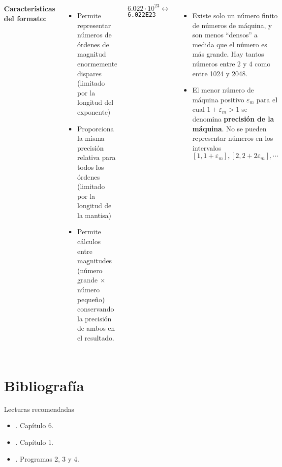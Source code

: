 \documentclass[9pt, aspectratio=169]{beamer}
\begin{document}
\begin{frame}
\begin{columns}[t]
\cx
\textbf{Características del formato:}
\begin{itemize}
    \item Permite representar números de órdenes de magnitud enormemente dispares (limitado por la longitud del exponente)
    \item Proporciona la misma precisión relativa para todos los órdenes (limitado por la longitud de la mantisa)
    \item Permite cálculos entre magnitudes (número grande $\times$ número pequeño) conservando la precisión de ambos en el resultado.
\end{itemize}

\begin{center}
    $6.022 \cdot 10^{23} \longleftrightarrow$ \texttt{6.022E23}
\end{center}

\cx
\begin{itemize}
    \item Existe solo un número finito de números de máquina, y son menos ``densos'' a medida que el número es más grande. Hay tantos números entre 2 y 4 como entre 1024 y 2048.
    \item El menor número de máquina positivo $\varepsilon_m$ para el cual $1 + \varepsilon_m > 1$ se denomina \textbf{precisión de la máquina}. No se pueden representar números en los intervalos $[1, 1 + \varepsilon_m], [2, 2 + 2 \varepsilon_m], \cdots $
\end{itemize}

\end{columns}
\end{frame}

\section*{Bibliografía}
\begin{frame}[allowframebreaks]{Lecturas recomendadas}
\begin{itemize}
 \item {}. Capítulo 6.
 \item {}. Capítulo 1.
 \item {}. Programas 2, 3 y 4.
\end{itemize}
\end{frame}
\end{document}
